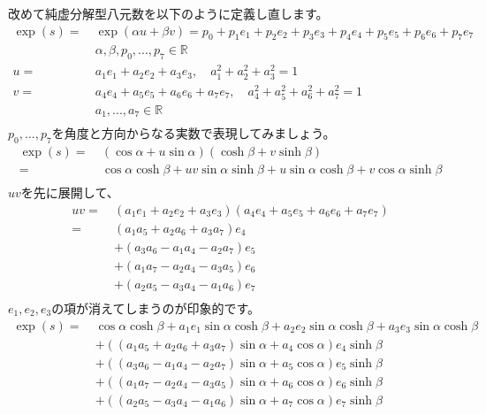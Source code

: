 \documentclass[a4paper,12pt,notitlepage]{jsreport}
\begin{document}
改めて純虚分解型八元数を以下のように定義し直します。
\begin{equation}
  \begin{split}
    \exp(s)=~&\exp(\alpha u+\beta v)=p_0+p_1e_1+p_2e_2+p_3e_3+p_4e_4+p_5e_5+p_6e_6+p_7e_7\\
    &\alpha,\beta,p_0,...,p_7\in\mathbb{R}\\
    u=~&a_1e_1+a_2e_2+a_3e_3,\quad a_1^2+a_2^2+a_3^2=1\\
    v=~&a_4e_4+a_5e_5+a_6e_6+a_7e_7,\quad a_4^2+a_5^2+a_6^2+a_7^2=1\\
    &a_1,...,a_7\in\mathbb{R}\\
  \end{split}
\end{equation}
$p_0,...,p_7$を角度と方向からなる実数で表現してみましょう。
\begin{equation}
  \begin{split}
    \exp(s)=~&(\cos\alpha+u\sin\alpha)(\cosh\beta+v\sinh\beta)\\
    =~&\cos\alpha\cosh\beta+uv\sin\alpha\sinh\beta+u\sin\alpha\cosh\beta+v\cos\alpha\sinh\beta\\
  \end{split}
\end{equation}
$uv$を先に展開して、
\begin{equation}
  \begin{split}
    uv=~&(a_1e_1+a_2e_2+a_3e_3)(a_4e_4+a_5e_5+a_6e_6+a_7e_7)\\
    =~&(a_1a_5+a_2a_6+a_3a_7)e_4\\
    &+(a_3a_6-a_1a_4-a_2a_7)e_5\\
    &+(a_1a_7-a_2a_4-a_3a_5)e_6\\
    &+(a_2a_5-a_3a_4-a_1a_6)e_7\\
  \end{split}
\end{equation}
$e_1,e_2,e_3$の項が消えてしまうのが印象的です。
\begin{equation}
  \begin{split}
    \exp(s)=~&\cos\alpha\cosh\beta+a_1e_1\sin\alpha\cosh\beta+a_2e_2\sin\alpha\cosh\beta+a_3e_3\sin\alpha\cosh\beta\\
    &+((a_1a_5+a_2a_6+a_3a_7)\sin\alpha+a_4\cos\alpha)e_4\sinh\beta\\
    &+((a_3a_6-a_1a_4-a_2a_7)\sin\alpha+a_5\cos\alpha)e_5\sinh\beta\\
    &+((a_1a_7-a_2a_4-a_3a_5)\sin\alpha+a_6\cos\alpha)e_6\sinh\beta\\
    &+((a_2a_5-a_3a_4-a_1a_6)\sin\alpha+a_7\cos\alpha)e_7\sinh\beta\\
  \end{split}
\end{equation}
\end{document}
